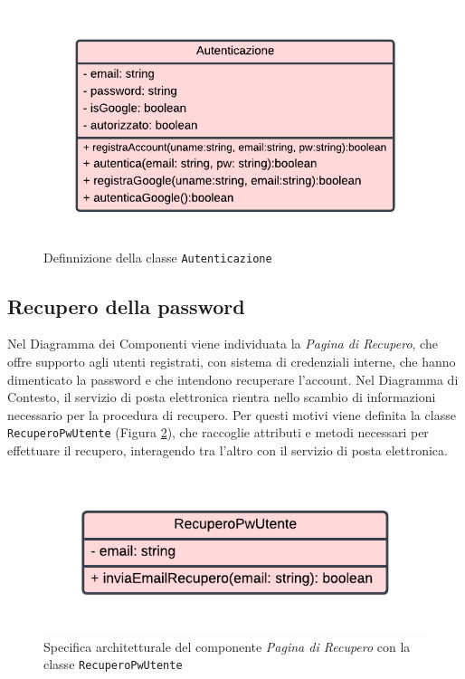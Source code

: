 \documentclass[11pt, a4paper]{article}
\theoremstyle{definition} %
\begin{document}
\begin{figure}[H]
\centering
\includegraphics[scale = 0.85]{materiale/class-autenticazione.pdf}
\caption{Definnizione della classe \texttt{Autenticazione}}
\label{autenticaz}
\end{figure}


\subsection{Recupero della password}
Nel Diagramma dei Componenti viene individuata la \textit{Pagina di Recupero},
che offre supporto agli utenti registrati, con sistema di credenziali interne,
che hanno dimenticato la password e che intendono recuperare l'account.
Nel Diagramma di Contesto, il servizio di posta elettronica rientra nello
scambio di informazioni necessario per la procedura di recupero. Per
questi motivi viene definita la classe \texttt{RecuperoPwUtente} (Figura \ref{recupero}), che
raccoglie attributi e metodi necessari per effettuare il recupero,
interagendo tra l'altro con il servizio di posta elettronica.

\begin{figure}[H]
\centering
\includegraphics[scale = 0.85]{materiale/class-recupero.pdf}
\caption{Specifica architetturale del componente \textit{Pagina di Recupero} con la classe \texttt{RecuperoPwUtente}}
\label{recupero}
\end{figure}
\end{document}
